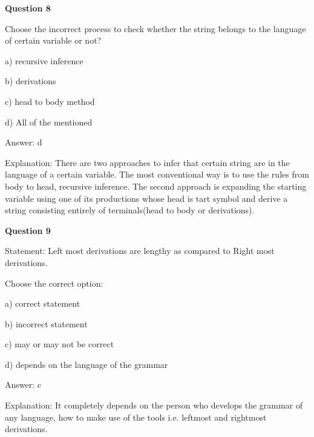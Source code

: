 \documentclass{article}
\begin{document}
\begin{mdframed}[linewidth=1pt, roundcorner=5pt, linecolor=gray!30, backgroundcolor=gray!5]
\textbf{Question 8} 

Choose the incorrect process to check whether the string belongs to the language of certain variable or not?

a) recursive inference

b) derivations

c) head to body method

d) All of the mentioned
\vspace{5pt} \par
\begin{tcolorbox}[colback=green!5, colframe=green!40!black, title=Solution]
Answer: d

Explanation: There are two approaches to infer that certain string are in the language of a certain variable. The most conventional way is to use the rules from body to head, recursive inference. The second approach is expanding the starting variable using one of its productions whose head is tart symbol and derive a string consisting entirely of terminals(head to body or derivations).
\end{tcolorbox}
\end{mdframed}

\begin{mdframed}[linewidth=1pt, roundcorner=5pt, linecolor=gray!30, backgroundcolor=gray!5]
\textbf{Question 9} 

Statement: Left most derivations are lengthy as compared to Right most derivations.

Choose the correct option:

a) correct statement

b) incorrect statement

c) may or may not be correct

d) depends on the language of the grammar
\vspace{5pt} \par
\begin{tcolorbox}[colback=green!5, colframe=green!40!black, title=Solution]
Answer: c

Explanation: It completely depends on the person who develops the grammar of any language, how to make use of the tools i.e. leftmost and rightmost derivations.
\end{tcolorbox}
\end{mdframed}
\newpage
\end{document}
